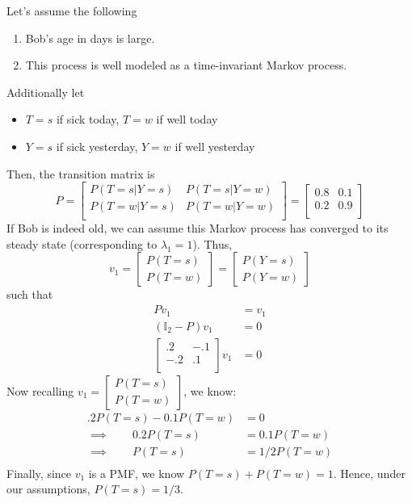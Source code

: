 \documentclass[paper=a4, fontsize=11pt]{scrartcl} %
\numberwithin{equation}{section} %
\numberwithin{figure}{section} %
\numberwithin{table}{section} %
\begin{document}
Let's assume the following
\begin{enumerate}
\item Bob's age in days is large.
\item This process is well modeled as a time-invariant Markov process.
\end{enumerate}
Additionally let
\begin{itemize}
\item $T = s$ if sick today, $T = w$ if well today
\item $Y = s$ if sick yesterday, $Y = w$ if well yesterday
\end{itemize}
Then, the transition matrix is
\[P = \left[
\begin{matrix}
P(T = s | Y = s) & P(T = s | Y = w) \\
P(T = w | Y = s) & P(T = w | Y = w) \\
\end{matrix} \right]
= \left[
\begin{matrix}
0.8 & 0.1 \\
0.2 & 0.9 \\
\end{matrix} \right]
\]
If Bob is indeed old, we can assume this Markov process has converged to its steady state (corresponding to $\lambda_1 = 1$). Thus,
\[ v_1 =\left[ \begin{matrix}P(T = s) \\ P(T = w) \end{matrix} \right] =  \left[ \begin{matrix} P(Y = s) \\ P(Y = w) \end{matrix} \right] \]
such that
\begin{align*}
P v_1  &=v_1 \\
(\mathbb{I}_2 - P) v_1 &= 0 \\
\left[ \begin{matrix} .2 & -.1 \\ -.2 & .1 \\ \end{matrix} \right] v_1 &= 0
\end{align*}
Now recalling $v_1 = \left[ \begin{matrix} P(T = s) \\ P(T = w) \end{matrix} \right]$, we know:
\begin{align*}
.2P(T = s) - 0.1P(T = w) &= 0 \\
\implies \qquad{} 0.2P(T = s) &= 0.1P(T = w) \\
\implies \qquad{} P(T = s) &= 1/2 P(T = w) \\
\end{align*}
Finally, since $v_1$ is a PMF, we know $P(T = s) + P(T = w) = 1$. Hence, under our assumptions, $P(T = s) = 1/3$.
\end{document}
